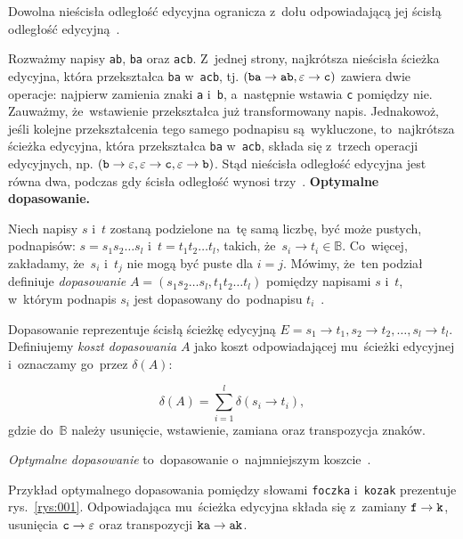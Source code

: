 \documentclass{praca1}
\begin{document}
\begin{lemma}
Dowolna nieścisła odległość edycyjna ogranicza z~dołu odpowiadającą jej ścisłą odległość edycyjną~\cite{Boytsov2011:indexingmethods}.
\end{lemma}

Rozważmy napisy \verb|ab|, \verb|ba| oraz \verb|acb|. Z~jednej strony, najkrótsza nieścisła ścieżka edycyjna, która przekształca \verb|ba| w~\verb|acb|, tj. $(\verb|ba| \rightarrow \verb|ab|, \varepsilon \rightarrow \verb|c|)$ zawiera dwie operacje: najpierw zamienia znaki \verb|a| i~\verb|b|, a~następnie wstawia \verb|c| pomiędzy nie. Zauważmy, że~wstawienie przekształca już transformowany napis. Jednakowoż, jeśli kolejne przekształcenia tego samego podnapisu są~wykluczone, to~najkrótsza ścieżka edycyjna, która przekształca \verb|ba| w~\verb|acb|, składa się z~trzech operacji edycyjnych, np. $(\verb|b| \rightarrow \varepsilon, \varepsilon \rightarrow \verb|c|, \varepsilon \rightarrow \verb|b|)$. Stąd nieścisła odległość edycyjna jest równa dwa, podczas gdy ścisła odległość wynosi trzy~\cite{Boytsov2011:indexingmethods}. 
\textbf{Optymalne dopasowanie.} 
\begin{definition}
Niech napisy $s$ i~$t$ zostaną podzielone na~tę samą liczbę, być może pustych, podnapisów: $s = s_1 s_2 \ldots s_l$ i~$t = t_1 t_2 \ldots t_l$, takich, że~$s_i \rightarrow t_i \in \mathbb{B}$. Co~więcej, zakładamy, że~$s_i$ i~$t_j$ nie mogą być puste dla $i = j$. Mówimy, że~ten podział definiuje \emph{dopasowanie} $A = (s_1 s_2\ldots s_l, t_1 t_2 \ldots t_l)$ pomiędzy napisami $s$ i~$t$, w~którym podnapis $s_i$ jest dopasowany do~podnapisu $t_i$~\cite{Boytsov2011:indexingmethods}.
\end{definition}

Dopasowanie reprezentuje ścisłą ścieżkę edycyjną $E = s_1 \rightarrow t_1, s_2 \rightarrow t_2, \ldots, s_l \rightarrow t_l$. Definiujemy \emph{koszt dopasowania} $A$ jako koszt odpowiadającej mu~ścieżki edycyjnej i~oznaczamy go~przez $\delta(A)$:

\begin{equation}
\label{eq:003}
\delta(A) = \sum\limits_{i = 1}^{l} \delta(s_i \rightarrow t_i),
\end{equation}
gdzie do~$\mathbb{B}$ należy usunięcie, wstawienie, zamiana oraz transpozycja znaków.

\emph{Optymalne dopasowanie} to~dopasowanie o~najmniejszym koszcie~\cite{Boytsov2011:indexingmethods}.


\begin{example}
Przykład optymalnego dopasowania pomiędzy słowami \verb|foczka| i~\verb|kozak| prezentuje rys.~\ref{rys:001}. Odpowiadająca mu~ścieżka edycyjna składa się z~zamiany $\verb|f| \rightarrow \verb|k|$, usunięcia $\verb|c| \rightarrow \varepsilon$ oraz transpozycji $\verb|ka| \rightarrow \verb|ak|$.
\end{example}
\end{document}
